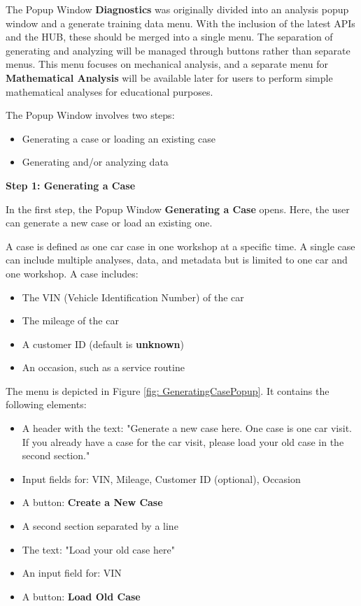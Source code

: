 \documentclass[]{scrreprt}
\begin{document}
The Popup Window \textbf{Diagnostics} was originally divided into an analysis popup window and a generate training data menu. With the inclusion of the latest APIs and the HUB, these should be merged into a single menu. The separation of generating and analyzing will be managed through buttons rather than separate menus. This menu focuses on mechanical analysis, and a separate menu for \textbf{Mathematical Analysis} will be available later for users to perform simple mathematical analyses for educational purposes.

The Popup Window involves two steps:

\begin{itemize}
    \item Generating a case or loading an existing case
    \item Generating and/or analyzing data
\end{itemize}

\textbf{Step 1: Generating a Case}

In the first step, the Popup Window \textbf{Generating a Case} opens. Here, the user can generate a new case or load an existing one.

A case is defined as one car case in one workshop at a specific time. A single case can include multiple analyses, data, and metadata but is limited to one car and one workshop. A case includes:
\begin{itemize}
    \item The VIN (Vehicle Identification Number) of the car
    \item The mileage of the car
    \item A customer ID (default is \textbf{unknown})
    \item An occasion, such as a service routine
\end{itemize}

The menu is depicted in Figure \ref{fig: GeneratingCasePopup}. It contains the following elements:
\begin{itemize}
    \item A header with the text: "Generate a new case here. One case is one car visit. If you already have a case for the car visit, please load your old case in the second section."
    \item Input fields for: VIN, Mileage, Customer ID (optional), Occasion
    \item A button: \textbf{Create a New Case}
    \item A second section separated by a line
    \item The text: "Load your old case here"
    \item An input field for: VIN
    \item A button: \textbf{Load Old Case}
\end{itemize}
\end{document}
